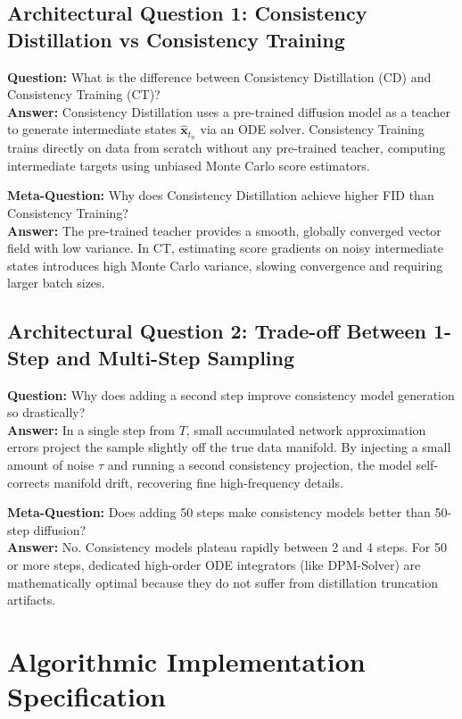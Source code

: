 \documentclass[11pt,a4paper]{article}
\theoremstyle{definition}
\begin{document}
\subsection{Architectural Question 1: Consistency Distillation vs Consistency Training}
\textbf{Question:} What is the difference between Consistency Distillation (CD) and Consistency Training (CT)?\\
\textbf{Answer:} Consistency Distillation uses a pre-trained diffusion model as a teacher to generate intermediate states $\hat{\mathbf{x}}_{t_n}$ via an ODE solver. Consistency Training trains directly on data from scratch without any pre-trained teacher, computing intermediate targets using unbiased Monte Carlo score estimators.

\textbf{Meta-Question:} Why does Consistency Distillation achieve higher FID than Consistency Training?\\
\textbf{Answer:} The pre-trained teacher provides a smooth, globally converged vector field with low variance. In CT, estimating score gradients on noisy intermediate states introduces high Monte Carlo variance, slowing convergence and requiring larger batch sizes.

\subsection{Architectural Question 2: Trade-off Between 1-Step and Multi-Step Sampling}
\textbf{Question:} Why does adding a second step improve consistency model generation so drastically?\\
\textbf{Answer:} In a single step from $T$, small accumulated network approximation errors project the sample slightly off the true data manifold. By injecting a small amount of noise $\tau$ and running a second consistency projection, the model self-corrects manifold drift, recovering fine high-frequency details.

\textbf{Meta-Question:} Does adding 50 steps make consistency models better than 50-step diffusion?\\
\textbf{Answer:} No. Consistency models plateau rapidly between 2 and 4 steps. For 50 or more steps, dedicated high-order ODE integrators (like DPM-Solver) are mathematically optimal because they do not suffer from distillation truncation artifacts.

\section{Algorithmic Implementation Specification}
\end{document}
